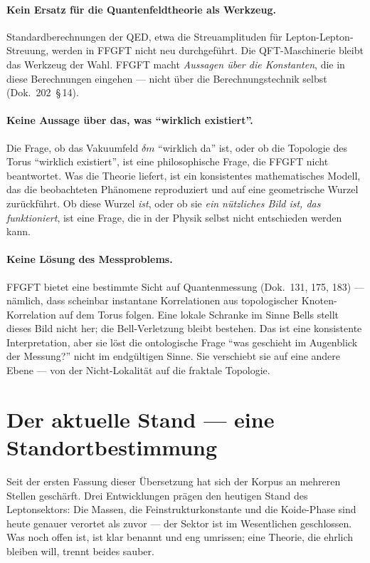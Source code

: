 \paragraph{Kein Ersatz für die Quantenfeldtheorie als Werkzeug.}
Standardberechnungen der QED, etwa die Streuamplituden für
Lepton-Lepton-Streuung, werden in FFGFT nicht neu durchgeführt. Die
QFT-Maschinerie bleibt das Werkzeug der Wahl. FFGFT macht
\emph{Aussagen über die Konstanten}, die in diese Berechnungen
eingehen --- nicht über die Berechnungstechnik selbst (Dok.~202~\S\,14).

\paragraph{Keine Aussage über das, was \enquote{wirklich existiert}.}
Die Frage, ob das Vakuumfeld $\delta m$ \enquote{wirklich da} ist, oder
ob die Topologie des Torus \enquote{wirklich existiert}, ist eine
philosophische Frage, die FFGFT nicht beantwortet. Was die Theorie
liefert, ist ein konsistentes mathematisches Modell, das die
beobachteten Phänomene reproduziert und auf eine geometrische Wurzel
zurückführt. Ob diese Wurzel \emph{ist}, oder ob sie \emph{ein
nützliches Bild ist, das funktioniert}, ist eine Frage, die in der
Physik selbst nicht entschieden werden kann.

\paragraph{Keine Lösung des Messproblems.}
FFGFT bietet eine bestimmte Sicht auf Quantenmessung
(Dok.~131, 175, 183) --- nämlich, dass scheinbar instantane
Korrelationen aus topologischer Knoten-Korrelation auf dem Torus
folgen. Eine lokale Schranke im Sinne Bells stellt dieses Bild nicht
her; die Bell-Verletzung bleibt bestehen. Das ist eine konsistente
Interpretation, aber sie löst die ontologische Frage \enquote{was
geschieht im Augenblick der Messung?} nicht im endgültigen Sinne.
Sie verschiebt sie auf eine andere Ebene --- von der
Nicht-Lokalität auf die fraktale Topologie.

\section{Der aktuelle Stand --- eine Standortbestimmung}

Seit der ersten Fassung dieser Übersetzung hat sich der Korpus an
mehreren Stellen geschärft. Drei Entwicklungen prägen den heutigen Stand
des Leptonsektors: Die Massen, die Feinstrukturkonstante und die
Koide-Phase sind heute genauer verortet als zuvor --- der Sektor ist im
Wesentlichen geschlossen. Was noch offen ist, ist klar benannt und eng
umrissen; eine Theorie, die ehrlich bleiben will, trennt beides sauber.

